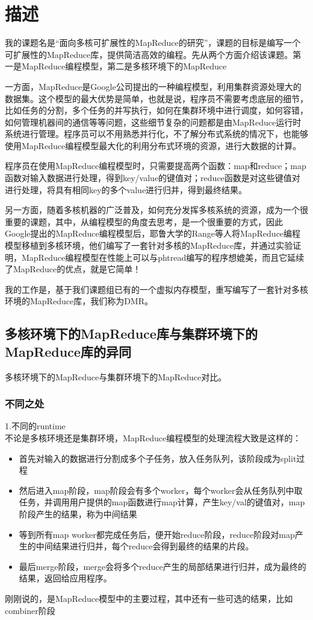 \section{描述}
我的课题名是“面向多核可扩展性的MapReduce的研究”，课题的目标是编写一个可扩展性的MapReduce库，提供简洁高效的编程。先从两个方面介绍该课题。第一是MapReduce编程模型，第二是多核环境下的MapReduce

一方面，MapReduce是Google公司提出的一种编程模型，利用集群资源处理大的数据集。这个模型的最大优势是简单，也就是说，程序员不需要考虑底层的细节，比如任务的分割，多个任务的并写执行，如何在集群环境中进行调度，如何容错，如何管理机器间的通信等等问题，这些细节复杂的问题都是由MapReduce运行时系统进行管理。程序员可以不用熟悉并行化，不了解分布式系统的情况下，也能够使用MapReduce编程模型最大化的利用分布式环境的资源，进行大数据的计算。

程序员在使用MapReduce编程模型时，只需要提高两个函数：map和reduce；map函数对输入数据进行处理，得到key/value的键值对；reduce函数是对这些键值对进行处理，将具有相同key的多个value进行归并，得到最终结果。


另一方面，随着多核机器的广泛普及，如何充分发挥多核系统的资源，成为一个很重要的课题，其中，从编程模型的角度去思考，是一个很重要的方式，因此Google提出的MapReduce编程模型后，耶鲁大学的Range等人将MapReduce编程模型移植到多核环境，他们编写了一套针对多核的MapReduce库，并通过实验证明，MapReduce编程模型在性能上可以与phtread编写的程序想媲美，而且它延续了MapReduce的优点，就是它简单！

我的工作是，基于我们课题组已有的一个虚拟内存模型，重写编写了一套针对多核环境的MapReduce库，我们称为DMR。

\subsection{多核环境下的MapReduce库与集群环境下的MapReduce库的异同}
多核环境下的MapReduce与集群环境下的MapReduce对比。

\subsubsection{不同之处}
1.不同的runtime\\
不论是多核环境还是集群环境，MapReduce编程模型的处理流程大致是这样的：
\begin{itemize}
  \item 首先对输入的数据进行分割成多个子任务，放入任务队列，该阶段成为split过程
  \item 然后进入map阶段，map阶段会有多个worker，每个worker会从任务队列中取任务，并调用用户提供的map函数进行map计算，产生key/val的键值对，map阶段产生的结果，称为中间结果
  \item 等到所有map worker都完成任务后，便开始reduce阶段，reduce阶段对map产生的中间结果进行归并，每个reduce会得到最终的结果的片段。
  \item 最后merge阶段，merge会将多个reduce产生的局部结果进行归并，成为最终的结果，返回给应用程序。
\end{itemize}
刚刚说的，是MapReduce模型中的主要过程，其中还有一些可选的结果，比如combiner阶段

